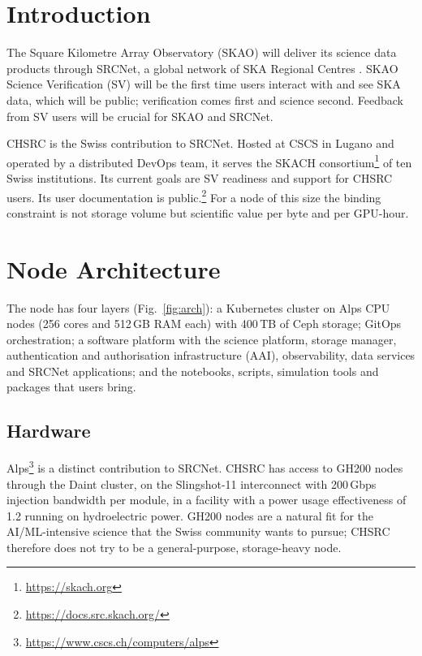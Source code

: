 \documentclass[11pt,twoside]{article}
\begin{document}

\section{Introduction}

The Square Kilometre Array Observatory (SKAO) will deliver its science data products through SRCNet, a global network of SKA Regional Centres \citep{2009IEEEP..97.1482D}. SKAO Science Verification (SV) will be the first time users interact with and see SKA data, which will be public; verification comes first and science second. Feedback from SV users will be crucial for SKAO and SRCNet.

CHSRC is the Swiss contribution to SRCNet. Hosted at CSCS in Lugano and operated by a distributed DevOps team, it serves the SKACH consortium\footnote{\url{https://skach.org}} of ten Swiss institutions. Its current goals are SV readiness and support for CHSRC users. Its user documentation is public.\footnote{\url{https://docs.src.skach.org/}} For a node of this size the binding constraint is not storage volume but scientific value per byte and per GPU-hour.

\section{Node Architecture}

The node has four layers (Fig.~\ref{fig:arch}): a Kubernetes cluster on Alps CPU nodes (256 cores and 512\,GB RAM each) with 400\,TB of Ceph storage; GitOps orchestration; a software platform with the science platform, storage manager, authentication and authorisation infrastructure (AAI), observability, data services and SRCNet applications; and the notebooks, scripts, simulation tools and packages that users bring.


\subsection{Hardware}
Alps\footnote{\url{https://www.cscs.ch/computers/alps}} is a distinct contribution to SRCNet. CHSRC has access to GH200 nodes through the Daint cluster, on the Slingshot-11 interconnect with 200\,Gbps injection bandwidth per module, in a facility with a power usage effectiveness of 1.2 running on hydroelectric power. GH200 nodes are a natural fit for the AI/ML-intensive science that the Swiss community wants to pursue; CHSRC therefore does not try to be a general-purpose, storage-heavy node.
\end{document}
